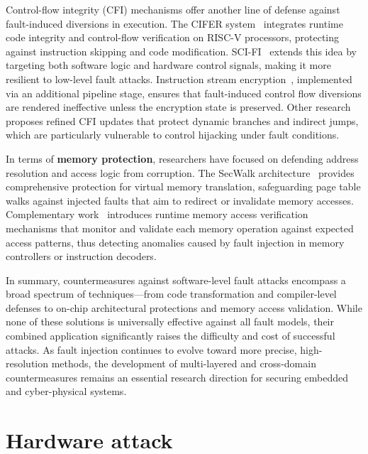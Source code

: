 Control-flow integrity (CFI) mechanisms offer another line of defense against fault-induced diversions in execution. The CIFER system~\cite{zgheib2023cifer} integrates runtime code integrity and control-flow verification on RISC-V processors, protecting against instruction skipping and code modification. SCI-FI~\cite{chamelot2022scifi} extends this idea by targeting both software logic and hardware control signals, making it more resilient to low-level fault attacks. Instruction stream encryption~\cite{werner2019riscv}, implemented via an additional pipeline stage, ensures that fault-induced control flow diversions are rendered ineffective unless the encryption state is preserved. Other research~\cite{nasahl2021arm} proposes refined CFI updates that protect dynamic branches and indirect jumps, which are particularly vulnerable to control hijacking under fault conditions.

In terms of \textbf{memory protection}, researchers have focused on defending address resolution and access logic from corruption. The SecWalk architecture~\cite{Schilling2021} provides comprehensive protection for virtual memory translation, safeguarding page table walks against injected faults that aim to redirect or invalidate memory accesses. Complementary work~\cite{Schilling2018} introduces runtime memory access verification mechanisms that monitor and validate each memory operation against expected access patterns, thus detecting anomalies caused by fault injection in memory controllers or instruction decoders.

In summary, countermeasures against software-level fault attacks encompass a broad spectrum of techniques—from code transformation and compiler-level defenses to on-chip architectural protections and memory access validation. While none of these solutions is universally effective against all fault models, their combined application significantly raises the difficulty and cost of successful attacks. As fault injection continues to evolve toward more precise, high-resolution methods, the development of multi-layered and cross-domain countermeasures remains an essential research direction for securing embedded and cyber-physical systems.

\section{Hardware attack}
